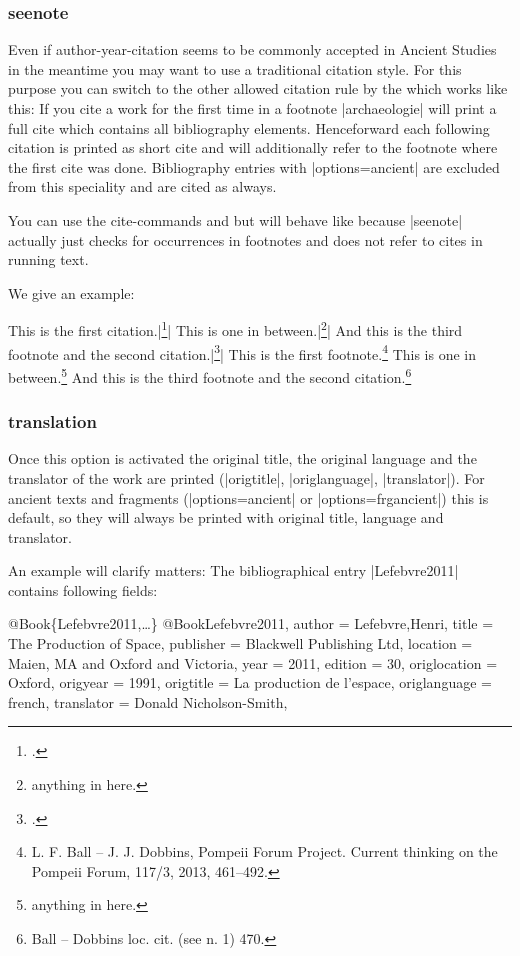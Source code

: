 \documentclass[a4paper,
10pt,
greek,
french,
spanish,
italian,
ngerman,
english
]{ltxdoc}
\begin{document}
\subsubsection{seenote}\label{seenote}
Even if author-year-citation seems to be commonly accepted in Ancient Studies in the meantime you may want to use a traditional citation style. 
For this purpose you can switch to the other allowed citation rule by the \DAI
which works like this:
If you cite a work for the first time in a footnote |archaeologie| will print a full cite which contains all bibliography elements.
Henceforward each following citation is printed as short cite and will additionally refer to the footnote where the first cite was done.
Bibliography entries with |options={ancient}| are excluded from this speciality and are cited as always.

You can use the cite-commands  and  but  
will behave like  because |seenote| actually just checks for occurrences in footnotes and does not refer to cites in running text.

We give an example:
\begin{tcolorbox}[examplebox] 
This is the first citation.|\footnote{\cite{Ball2013}.}|
This is one in between.|\footnote{anything in here.}|
And this is the third footnote and the second citation.|\footnote{\cite[470]{Ball2013}.}|
\tcblower
This is the first footnote.\footnote{L. F. Ball – J. J. Dobbins, Pompeii Forum Project. Current thinking on the Pompeii Forum, 117/3, 2013, 461–492.}
This is one in between.\footnote{anything in here.}
And this is the third footnote and the second citation.\footnote{Ball – Dobbins loc. cit. (see n. 1) 470.}
\end{tcolorbox}




\subsubsection{translation}\label{translation}
Once this option is activated the original title, the original language and the translator of the work are printed (|origtitle|, |origlanguage|, |translator|).
For ancient texts and fragments (|options={ancient}| or |options={frgancient}|) this is default, 
so they will always be printed with original title, language and translator.

An example will clarify matters:
The bibliographical entry |Lefebvre2011| contains following fields:
\begin{bibexample}[label=Lefebvre2011]{{@}Book\{Lefebvre2011,…\}}
@Book{Lefebvre2011,
  author       = {Lefebvre,Henri},
  title        = {The Production of Space},
  publisher    = {Blackwell Publishing Ltd},
  location     = {Maien, MA and Oxford and Victoria},
  year         = {2011},
  edition      = {30},
  origlocation = {Oxford},
  origyear     = {1991},
  origtitle    = {La production de l’espace},
  origlanguage = {french},
  translator   = {Donald Nicholson-Smith},
}
\end{bibexample}
\end{document}
